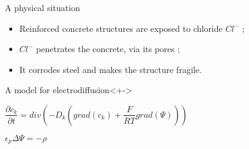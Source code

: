
\begin{frame}
%
\begin{block}{A physical situation}
\begin{itemize}%
\item<+-> Reinforced concrete structures are exposed to chloride $Cl^-$ ;
\item<+-> $Cl^-$ penetrates the concrete, via its pores ;
\item<+-> It corrodes steel and makes the structure fragile.
\end{itemize}
\end{block}
%
\begin{block}{A model for electrodiffusion}<+->
\begin{description}
\item<+-> [The Nernst-Planck equation] $\dfrac{\partial{c_k}}{\partial{t}}=div\left(-D_k\left(grad(c_k)+\dfrac{F}{RT}grad(\Psi)\right)\right)$
\item<+-> [Poisson equation] $\epsilon_p \Delta \Psi=-\rho$
\end{description}
\end{block}
%
%
\end{frame}

